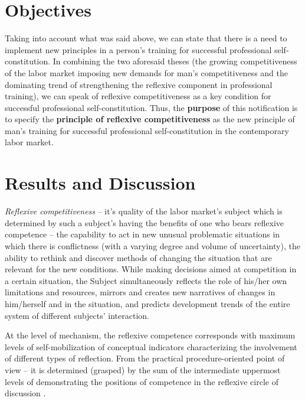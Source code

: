 \documentclass[conference]{IEEEtran}
\begin{document}
\section{Objectives}
Taking into account what was said above, we can state that there is a need to implement new principles in a person’s training for successful professional self-constitution. In combining the two aforesaid theses (the growing competitiveness of the labor market imposing new demands for man’s competitiveness and the dominating trend of strengthening the reflexive component in professional training), we can speak of reflexive competitiveness as a key condition for successful professional self-constitution. Thus, the \textbf{purpose} of this notification is to specify the \textbf{principle of reflexive competitiveness} as the new principle of man’s training for successful professional self-constitution in the contemporary labor market. 

\section{Results and Discussion}

\textit{Reflexive competitiveness} – it’s quality of the labor market’s subject which is determined by such a subject’s having the benefits of one who bears reflexive competence – the capability to act in new unusual problematic situations in which there is conflictness (with a varying degree and volume of uncertainty), the ability to rethink and discover methods of changing the situation that are relevant for the new conditions. While making decisions aimed at competition in a certain situation, the Subject simultaneously reflects the role of his/her own limitations and resources, mirrors and creates new narratives of changes in him/herself and in the situation, and predicts development trends of the entire system of different subjects’ interaction.

At the level of mechanism, the reflexive competence corresponds with maximum levels of self-mobilization of conceptual indicators \cite{b6,b11,b12,b7,b8,b5} characterizing the involvement of different types of reflection. From the practical procedure-oriented point of view – it is determined (grasped) by the sum of the intermediate uppermost levels of demonstrating the positions of competence in the reflexive circle of discussion \cite{b8}.
\end{document}
